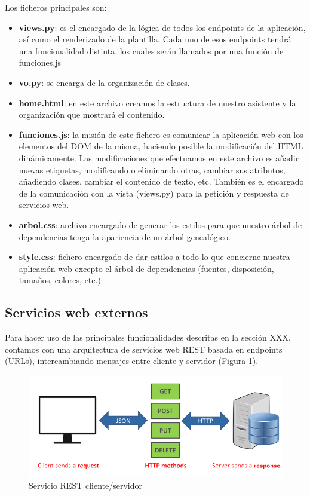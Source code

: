 Los ficheros principales son:
\begin{itemize}
	\item \textbf{views.py}: es el encargado de la lógica de todos los endpoints de la aplicación, así como el renderizado de la plantilla. Cada uno de esos endpoints tendrá una funcionalidad distinta, los cuales serán llamados por una función de funciones.js 
	\item \textbf{vo.py}: se encarga de la organización de clases.
	\item \textbf{home.html}: en este archivo creamos la estructura de nuestro asistente y la organización que mostrará el contenido.
	\item \textbf{funciones.js}: la misión de este fichero es comunicar la aplicación web con los elementos del DOM de la misma, haciendo posible la modificación del HTML dinámicamente. Las modificaciones que efectuamos en este archivo es añadir nuevas etiquetas, modificando o eliminando otras, cambiar sus atributos, añadiendo clases, cambiar el contenido de texto, etc. También es el encargado de la comunicación con la vista (views.py) para la petición y respuesta de servicios web.
	\item \textbf{arbol.css}: archivo encargado de generar los estilos para que nuestro árbol de dependencias tenga la apariencia de un árbol genealógico.
	\item \textbf{style.css}: fichero encargado de dar estilos a todo lo que concierne nuestra aplicación web excepto el árbol de dependencias (fuentes, disposición, tamaños, colores, etc.)   
\end{itemize}

\subsection{Servicios web externos}\label{sec:serviciosWebExternos}
Para hacer uso de las principales funcionalidades descritas en la sección XXX, contamos con una arquitectura de servicios web REST basada en endpoints (URLs), intercambiando mensajes entre cliente y servidor (Figura \ref{fig:apiRest}). 

\begin{figure}[h!]
	\centering
	
	
	\includegraphics[scale=0.4]{Imagenes/Figuras/rest_api}
	
	
	\caption{Servicio REST cliente/servidor}
	\label{fig:apiRest}
\end{figure}

